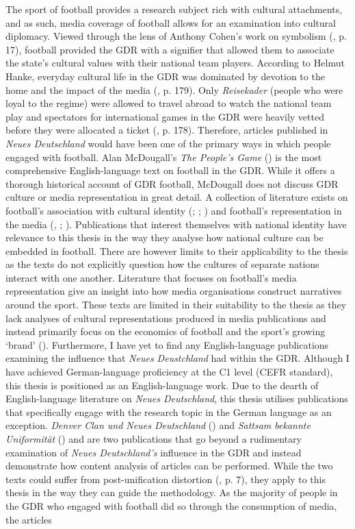 The sport of football provides a research subject rich with cultural attachments, and as such, media coverage of football allows for an examination into cultural diplomacy. Viewed through the lens of Anthony Cohen’s work on symbolism (\citeyear{cohen1995}, p. 17), football provided the GDR with a signifier that allowed them to associate the state’s cultural values with their national team players. According to Helmut Hanke, everyday cultural life in the GDR was dominated by devotion to the home and the impact of the media (\citeyear{hanke1990}, p. 179). Only \textit{Reisekader} (people who were loyal to the regime) were allowed to travel abroad to watch the national team play and spectators for international games in the GDR were heavily vetted before they were allocated a ticket (\cite{mcdougall2014}, p. 178). Therefore, articles published in \textit{Neues Deutschland} would have been one of the primary ways in which people engaged with football. Alan McDougall’s \textit{The People’s Game} (\citeyear{mcdougall2014}) is the most comprehensive English-language text on football in the GDR. While it offers a thorough historical account of GDR football, McDougall does not discuss GDR culture or media representation in great detail. A collection of literature exists on football’s association with cultural identity (\citeyear{archetti1994}; \cite{gibbons2014}; \cite{bocketti2016}) and football’s representation in the media (\cite{boylehaynes2004}, \cite{bridgewater2010}; \cite{miller2011}). Publications that interest themselves with national identity have relevance to this thesis in the way they analyse how national culture can be embedded in football. There are however limits to their applicability to the thesis as the texts do not explicitly question how the cultures of separate nations interact with one another. Literature that focuses on football’s media representation give an insight into how media organisations construct narratives around the sport. These texts are limited in their suitability to the thesis as they lack analyses of cultural representations produced in media publications and instead primarily focus on the economics of football and the sport’s growing ‘brand’ (\cite{bridgewater2010}). Furthermore, I have yet to find any English-language publications examining the influence that \textit{Neues Deustchland} had within the GDR. Although I have achieved German-language proficiency at the C1 level (CEFR standard), this thesis is positioned as an English-language work. Due to the dearth of English-language literature on \textit{Neues Deutschland}, this thesis utilises publications that specifically engage with the research topic in the German language as an exception. \textit{Denver Clan und Neues Deutschland} (\cite{meyen2003}) and \textit{Sattsam bekannte Uniformität} (\cite{meyenschweiger2008}) and are two publications that go beyond a rudimentary examination of \textit{Neues Deutschland’s} influence in the GDR and instead demonstrate how content analysis of articles can be performed. While the two texts could suffer from post-unification distortion (\cite{fullbrook1995}, p. 7), they apply to this thesis in the way they can guide the methodology. As the majority of people in the GDR who engaged with football did so through the consumption of media, the articles 